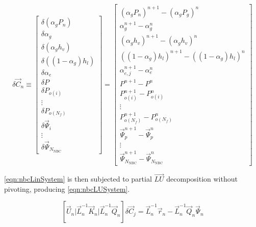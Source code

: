 \begin{equation}
\label{eqn:nbcUpdate}
\delta \vec{C}_{n} \equiv 
\begin{bmatrix}
\delta ( \alpha_{g} P_{n} ) \\
\delta \alpha_{g} \\
\delta ( \alpha_{g} h_v ) \\
\delta ( (1 - \alpha_{g} ) h_l ) \\
\delta \alpha_{e} \\
\delta P \\ 
\delta P_{o(i)} \\
\vdots \\
\delta P_{o(N_{f})} \\
\delta \vec{\Psi}_{i} \\
\vdots \\
\delta \vec{\Psi}_{N_{\text{NBC}}}
\end{bmatrix}
=
\begin{bmatrix}
( \alpha_{g} P_{n})^{n+1} - (\alpha_{g} P_{g} )^{n} \\
\alpha^{n+1}_{g} - \alpha^{n}_{g} \\
( \alpha_{g} h_{v} )^{n+1} - ( \alpha_{g} h_{v} )^{n} \\
( ( 1 - \alpha_{g} ) h_{l} )^{n+1} - ( ( 1 - \alpha_{g} ) h_{l} )^{n} \\
\alpha^{n+1}_{e,j} - \alpha^{n}_{e} \\
 P^{n+1} - P^{n} \\
 P_{o(i)}^{n+1} - P_{o(i)}^{n} \\
 \vdots \\
 P_{o(N_{f})}^{n+1} - P_{o(N_{f})}^{n} \\
 \vec{\Psi}_{p}^{n+1} - \vec{\Psi}_{p}^{n} \\
 \vdots \\
 \vec{\Psi}_{N_{\text{NBC}}}^{n+1} - \vec{\Psi}_{N_{\text{NBC}}}^{n}
\end{bmatrix}
\end{equation}

\eqref{eqn:nbcLinSystem} is then subjected to partial $\vec{LU}$ decomposition without pivoting, producing \eqref{eqn:nbcLUSystem}.

\begin{equation}
\label{eqn:nbcLUSystem}
\left[ \vec{U}_{n} \vert \vec{L}^{-1}_{n}\vec{K}_{n} \vert \vec{L}^{-1}_{n}\vec{Q}_{n} \right] \delta \vec{C}_{j} = \vec{L}^{-1}_{n}\vec{r}_{n}  -\vec{L}^{-1}_{n}\vec{Q}_{n}\vec{\Psi}_{n}
\end{equation}

